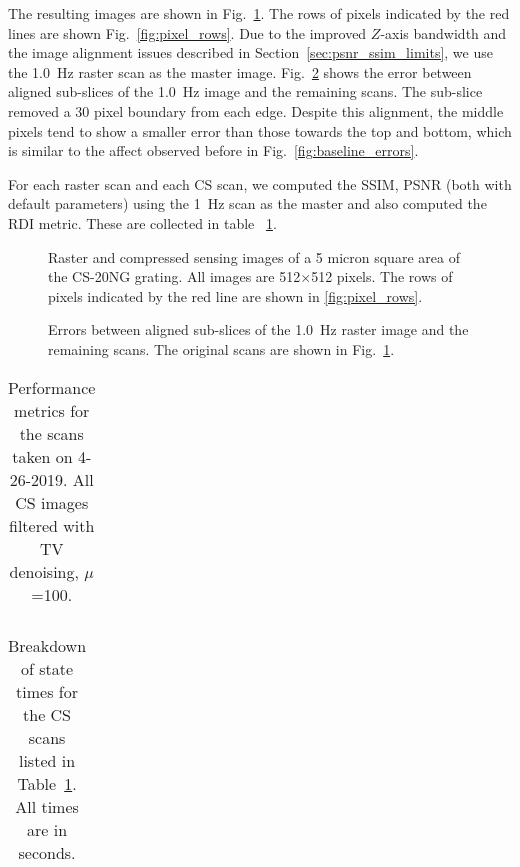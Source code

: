 The resulting images are shown in Fig.~\ref{fig:resultsF1_images}. The rows of pixels indicated by the red lines are shown Fig.~\ref{fig:pixel_rows}. Due to the improved $Z$-axis bandwidth and the image alignment issues described in Section~\ref{sec:psnr_ssim_limits}, we use the 1.0~Hz raster scan as the master image.
Fig.~\ref{fig:resultsF1_errs} shows the error between aligned sub-slices of the 1.0~Hz image and the remaining scans. The sub-slice removed a 30 pixel boundary from each edge. Despite this alignment, the middle pixels tend to show a smaller error than those towards the top and bottom, which is similar to the affect observed before in  Fig.~\ref{fig:baseline_errors}. 

For each raster scan and each CS scan, we computed the SSIM, PSNR (both with default parameters) using the 1~Hz scan as the master and also computed the RDI metric. These are collected in table ~\ref{tab:rast_vs_cs_v1}.

\begin{figure}
    
    \caption{Raster and compressed sensing images of a 5 micron square area of the CS-20NG grating. All images are 512$\times$512 pixels. The rows of pixels indicated by the red line are shown in \ref{fig:pixel_rows}.}
    \label{fig:resultsF1_images}
\end{figure}

\begin{figure}
    
    \caption{Errors between aligned sub-slices of the 1.0~Hz raster image and the remaining scans. The original scans are shown in Fig.~\ref{fig:resultsF1_images}.}  
    \label{fig:resultsF1_errs}
\end{figure}


\begin{table}[t!]
  \centering
  \caption{Performance metrics for the scans taken on 4-26-2019.  All CS images filtered with TV denoising, $\mu$=100.}
      \begin{tabular}{cccccc}
        
      \end{tabular}
      \label{tab:rast_vs_cs_v1}
\end{table}

\begin{table}[t!]
  \centering
  \caption{Breakdown of state times for the CS scans listed in Table~\ref{tab:rast_vs_cs_v1}. All times are in seconds.}
  \label{tab:final_state_times}
  \begin{tabular}{ccccccc}
    
  \end{tabular}
\end{table}

